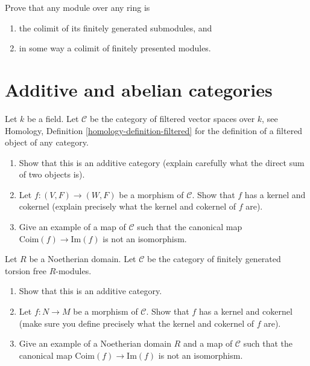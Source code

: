 \begin{exercise}
\label{exercise-colimit-modules}
Prove that any module over any ring is
\begin{enumerate}
\item the colimit of its finitely generated submodules, and
\item in some way a colimit of finitely presented modules.
\end{enumerate}
\end{exercise}





\section{Additive and abelian categories}
\label{section-additive}

\begin{exercise}
\label{exercise-filtered-vector-spaces}
Let $k$ be a field. Let $\mathcal{C}$ be the category of filtered vector
spaces over $k$, see
Homology, Definition \ref{homology-definition-filtered}
for the definition of a filtered object of any category.
\begin{enumerate}
\item Show that this is an additive category (explain carefully what the
direct sum of two objects is).
\item Let $f : (V, F) \to (W, F)$ be a morphism of $\mathcal{C}$.
Show that $f$ has a kernel and cokernel (explain precisely
what the kernel and cokernel of $f$ are).
\item Give an example of a map of $\mathcal{C}$ such that
the canonical map $\text{Coim}(f) \to \text{Im}(f)$ is not an isomorphism.\
\end{enumerate}
\end{exercise}

\begin{exercise}
\label{exercise-torsion-free}
Let $R$ be a Noetherian domain. Let $\mathcal{C}$ be the category of
finitely generated torsion free $R$-modules.
\begin{enumerate}
\item Show that this is an additive category.
\item Let $f : N \to M$ be a morphism of $\mathcal{C}$.
Show that $f$ has a kernel and cokernel (make sure you define precisely
what the kernel and cokernel of $f$ are).
\item Give an example of a Noetherian domain $R$ and a map of
$\mathcal{C}$ such that the canonical map $\text{Coim}(f) \to \text{Im}(f)$
is not an isomorphism.
\end{enumerate}
\end{exercise}

